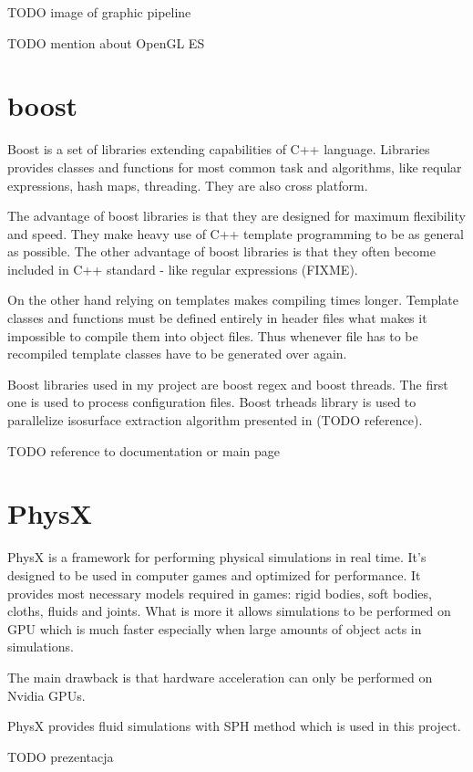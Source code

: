 TODO image of graphic pipeline

TODO mention about OpenGL ES

\section{boost}
Boost is a set of libraries extending capabilities of C++ language. Libraries provides classes and functions for most common task and algorithms, like reqular expressions, hash maps, threading. They are also cross platform. 

The advantage of boost libraries is that they are designed for maximum flexibility and speed. They make heavy use of C++ template programming to be as general as possible. The other advantage of boost libraries is that they often become included in C++ standard - like regular expressions (FIXME). 

On the other hand relying on templates makes compiling times longer. Template classes and functions must be defined entirely in header files what makes it impossible to compile them into object files. Thus whenever file has to be recompiled template classes have to be generated over again.

Boost libraries used in my project are boost regex and boost threads. The first one is used to process configuration files. Boost trheads library is used to parallelize isosurface extraction algorithm presented in (TODO reference).

TODO reference to documentation or main page

\section{PhysX}

PhysX is a framework for performing physical simulations in real time. It's designed to be used in computer games and optimized for performance. It provides most necessary models required in games: rigid bodies, soft bodies, cloths, fluids and joints. What is more it allows simulations to be performed on GPU which is much faster especially when large amounts of object acts in simulations.

The main drawback is that hardware acceleration can only be performed on Nvidia GPUs. 

PhysX provides fluid simulations with SPH method which is used in this project. 

TODO prezentacja



